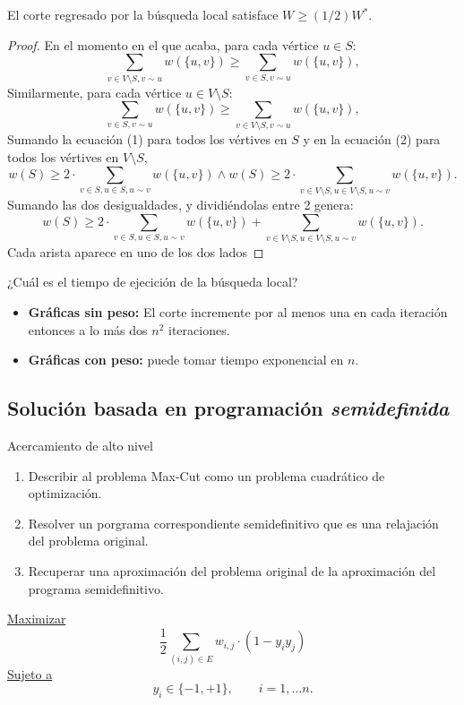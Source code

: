 \documentclass[letterpaper]{article}
\begin{document}
\begin{theorem}
    El corte regresado por la búsqueda local satisface $W \geq (1/2)W^*$.
    \begin{proof}
        En el momento en el que acaba, para cada vértice $u \in S$:
        \[
            \sum_{v \in V \setminus S, v \sim u} w(\{u,v\}) \geq 
            \sum_{v \in S, v \sim u} w(\{u,v\}), \tag{1}
        \]
        Similarmente, para cada vértice $u \in V\setminus S$:
        \[
            \sum_{v \in S, v \sim u} w(\{u,v\}) \geq 
            \sum_{v \in V\setminus S, v \sim u} w(\{u,v\}), \tag{2}
        \]
        Sumando la ecuación (1) para todos los vértives en $S$ y en la ecuación (2) para todos
        los vértives en $V \setminus S$,
        \[
            w(S)\geq 2 \cdot \sum_{v \in S, u \in S, u \sim v} w(\{u,v\}) \land
            w(S)\geq 2 \cdot \sum_{v \in V\setminus S, u \in V\setminus S, u \sim v} w(\{u,v\}).
        \]
        Sumando las dos desigualdades, y  dividiéndolas entre 2 genera:
        \[
            w(S)\geq 2 \cdot \sum_{v \in S, u \in S, u \sim v} w(\{u,v\}) +
            \sum_{v \in V\setminus S, u \in V\setminus S, u \sim v} w(\{u,v\}).
        \]
        Cada arista aparece en uno de los dos lados
    \end{proof}
\end{theorem}
¿Cuál es el tiempo de ejecición de la búsqueda local?
\begin{itemize}
    \item \textbf{Gráficas sin peso:} El corte incremente por al menos una en cada iteración
    entonces a lo más dos $n^2$ iteraciones.
    \item \textbf{Gráficas con peso:} puede tomar tiempo exponencial en $n$.
\end{itemize}

\subsection{Solución basada en programación \textit{semidefinida}}
Acercamiento de alto nivel
\begin{enumerate}
    \item Describir al problema Max-Cut como un problema cuadrático de optimización.
    \item Resolver un porgrama correspondiente semidefinitivo que es una relajación del problema original.
    \item Recuperar una aproximación del problema original de la aproximación del programa semidefinitivo.
\end{enumerate}
\underline{Maximizar}
\[   \frac{1}{2}\sum_{(i,j)\in E} w_{i,j}\cdot(1-y_iy_j)   \]
\underline{Sujeto a }
\[   y_i \in \{ -1, +1\}, \qquad i=1,\ldots n.   \]
\end{document}
